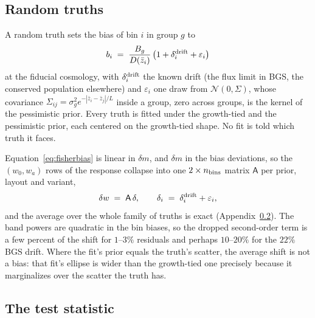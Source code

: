 \subsection{Random truths}
\label{sec:randomtruths}

A random truth sets the bias of bin $i$ in group $g$ to
\begin{equation}
  b_i \;=\; \frac{B_g}{D(\bar{z}_i)}\,
  \bigl(1 + \delta_i^{\rm drift} + \varepsilon_i\bigr)
  \label{eq:randomtruth}
\end{equation}
at the fiducial cosmology, with $\delta_i^{\rm drift}$ the known drift
(the flux limit in BGS, the conserved population elsewhere) and
$\varepsilon_i$ one draw from $\mathcal{N}(0, \Sigma)$, whose covariance
$\Sigma_{ij} = \sigma_g^2 e^{-|\bar{z}_i - \bar{z}_j|/L}$ inside a group,
zero across groups, is the kernel of the pessimistic prior.  Every
truth is fitted under the growth-tied and the pessimistic prior,
each centered on the growth-tied shape.  No fit is told which truth it
faces.

Equation~\eqref{eq:fisherbias} is linear in $\delta m$, and $\delta m$
in the bias deviations, so the $(w_0, w_a)$ rows of the response
collapse into one $2 \times n_{\rm bins}$ matrix $\mathsf{A}$ per
prior, layout and variant,
\begin{equation}
  \delta w \;=\; \mathsf{A}\,\delta,
  \qquad
  \delta_i \;=\; \delta_i^{\rm drift} + \varepsilon_i ,
  \label{eq:linearmap}
\end{equation}
and the average over the whole family of truths is exact
(Appendix~\ref{sec:inflation}).  The band powers are
quadratic in the bin biases, so the dropped second-order term is a few
percent of the shift for $1$--$3\%$ residuals and perhaps $10$--$20\%$
for the $22\%$ BGS drift.  Where the fit's prior equals the truth's
scatter, the average shift is not a bias: that fit's ellipse is wider
than the growth-tied one precisely because it marginalizes over the
scatter the truth has.

\subsection{The test statistic}
\label{sec:inflation}

